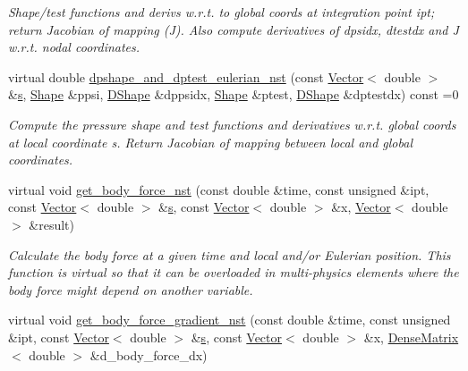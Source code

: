 \begin{DoxyCompactItemize}
\begin{DoxyCompactList}\small\item\em Shape/test functions and derivs w.\+r.\+t. to global coords at integration point ipt; return Jacobian of mapping (J). Also compute derivatives of dpsidx, dtestdx and J w.\+r.\+t. nodal coordinates. \end{DoxyCompactList}\item 
virtual double \hyperlink{classoomph_1_1GeneralisedNewtonianNavierStokesEquations_a00027d27dfdf3c0b72b0d1df9addfdc8}{dpshape\+\_\+and\+\_\+dptest\+\_\+eulerian\+\_\+nst} (const \hyperlink{classoomph_1_1Vector}{Vector}$<$ double $>$ \&\hyperlink{cfortran_8h_ab7123126e4885ef647dd9c6e3807a21c}{s}, \hyperlink{classoomph_1_1Shape}{Shape} \&ppsi, \hyperlink{classoomph_1_1DShape}{D\+Shape} \&dppsidx, \hyperlink{classoomph_1_1Shape}{Shape} \&ptest, \hyperlink{classoomph_1_1DShape}{D\+Shape} \&dptestdx) const =0
\begin{DoxyCompactList}\small\item\em Compute the pressure shape and test functions and derivatives w.\+r.\+t. global coords at local coordinate s. Return Jacobian of mapping between local and global coordinates. \end{DoxyCompactList}\item 
virtual void \hyperlink{classoomph_1_1GeneralisedNewtonianNavierStokesEquations_a1cb7e8f48bfc9cd81f63405fb2fd1795}{get\+\_\+body\+\_\+force\+\_\+nst} (const double \&time, const unsigned \&ipt, const \hyperlink{classoomph_1_1Vector}{Vector}$<$ double $>$ \&\hyperlink{cfortran_8h_ab7123126e4885ef647dd9c6e3807a21c}{s}, const \hyperlink{classoomph_1_1Vector}{Vector}$<$ double $>$ \&x, \hyperlink{classoomph_1_1Vector}{Vector}$<$ double $>$ \&result)
\begin{DoxyCompactList}\small\item\em Calculate the body force at a given time and local and/or Eulerian position. This function is virtual so that it can be overloaded in multi-\/physics elements where the body force might depend on another variable. \end{DoxyCompactList}\item 
virtual void \hyperlink{classoomph_1_1GeneralisedNewtonianNavierStokesEquations_a2ad8ab14cdeff6f411fe2c97cb12b431}{get\+\_\+body\+\_\+force\+\_\+gradient\+\_\+nst} (const double \&time, const unsigned \&ipt, const \hyperlink{classoomph_1_1Vector}{Vector}$<$ double $>$ \&\hyperlink{cfortran_8h_ab7123126e4885ef647dd9c6e3807a21c}{s}, const \hyperlink{classoomph_1_1Vector}{Vector}$<$ double $>$ \&x, \hyperlink{classoomph_1_1DenseMatrix}{Dense\+Matrix}$<$ double $>$ \&d\+\_\+body\+\_\+force\+\_\+dx)

\end{DoxyCompactItemize}
